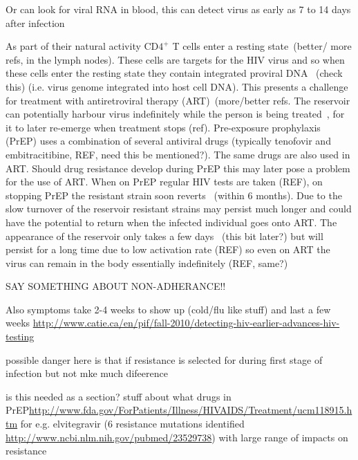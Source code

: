 \documentclass[DIV=15]{scrartcl}
\begin{document}
Or can look for viral RNA in blood, this can detect virus as early as  7 to 14 days after infection


As part of their natural activity CD$4^+$ T  cells enter a resting state~\cite{bukrinsky1991}(better/ more refs, in the lymph nodes). These cells are targets for the HIV virus and so when these cells enter the resting state they contain integrated  proviral  DNA~ \cite{chun1997,finzi1997}(check this) (i.e. virus genome integrated into host cell DNA).  This presents a challenge for treatment with antiretroviral therapy (ART)~\cite{chun2015}(more/better refs. 
The reservoir can potentially harbour virus indefinitely while the person is being treated~\cite{siliciano2003,crooks2015}, for  it to later re-emerge when treatment stops (ref).
Pre-exposure prophylaxis (PrEP) uses a combination of several antiviral drugs (typically tenofovir and embitracitibine, REF, need this be mentioned?). The same drugs are also used in ART. Should drug resistance develop during PrEP this may later pose a problem for the use of ART.  When on PrEP regular HIV tests are taken (REF), on stopping PrEP the resistant strain  soon reverts~\cite{weis2016} (within 6 months). 
Due to the slow turnover of the reservoir resistant strains may persist much longer and could have the potential to return when the infected individual goes onto ART.
The appearance of the reservoir   only takes a few days~\cite{sompayrac2011} (this bit later?) but will persist for a long time due to low activation rate \cite{finzi1999} (REF) so even on ART the virus can remain in the body essentially indefinitely (REF, same?)

SAY SOMETHING ABOUT NON-ADHERANCE!!



\iffalse

Also symptoms take 2-4 weeks to show up (cold/flu like stuff) and last a few weeks
\url{http://www.catie.ca/en/pif/fall-2010/detecting-hiv-earlier-advances-hiv-testing}

possible danger here is that if resistance is selected for during first stage of infection but not mke much difeerence 


is this needed as a section?
stuff about what drugs in PrEP\url{http://www.fda.gov/ForPatients/Illness/HIVAIDS/Treatment/ucm118915.htm} for e.g. elvitegravir (6 resistance mutations identified \url{http://www.ncbi.nlm.nih.gov/pubmed/23529738}) with large range of impacts on resistance    
\end{document}

